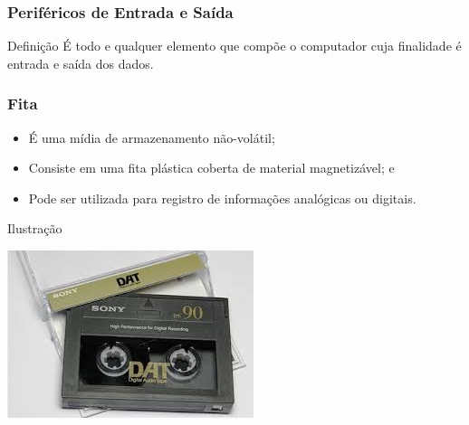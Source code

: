 \documentclass[aspectratio=169]{beamer} %
\begin{document}
\begin{frame}
	\frametitle{Periféricos de Entrada e Saída}
	
	\begin{block}{Defini\c cão}
		É todo e qualquer elemento que compõe o computador cuja finalidade é entrada e saída dos dados.
	\end{block}
\end{frame}

\begin{frame}
	\frametitle{Fita}
		
	\begin{itemize}
		\item É uma mídia de armazenamento não-volátil;
		\item Consiste em uma fita plástica coberta de material magnetizável; e 
		\item Pode ser utilizada para registro de informações analógicas ou digitais.
	\end{itemize}\vfill
	
	\begin{exampleblock}{Ilustra\c cão}
		\begin{center}
			\includegraphics[scale=0.4]{img/fita_dat}
		\end{center}		
	\end{exampleblock}
\end{frame}
\end{document}
